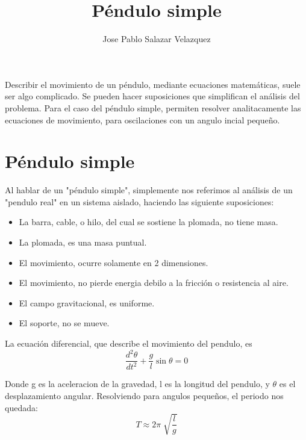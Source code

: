 \documentclass[12pt]{article}
\title{Péndulo simple}
\author{Jose Pablo Salazar Velazquez}
\date{}
\begin{document}
\maketitle
   Describir el movimiento de un péndulo, mediante ecuaciones matemáticas, suele ser algo complicado. Se pueden hacer suposiciones que simplifican el análisis del problema. Para el caso del péndulo simple, permiten resolver analitacamente las ecuaciones de movimiento, para oscilaciones con un angulo incial pequeño.
    
    \section{Péndulo simple}
Al hablar de un "péndulo simple", simplemente nos referimos al análisis de un "pendulo real" en un sistema aislado, haciendo las siguiente suposiciones:
          \begin{itemize}
         \item La barra, cable, o hilo, del cual se sostiene la plomada, no tiene masa.
         \item La plomada, es una masa puntual.
         \item El movimiento, ocurre solamente en 2 dimensiones.
         \item El movimiento, no pierde energia debilo a la fricción o resistencia al aire.
         \item El campo gravitacional, es uniforme.
         \item El soporte, no se mueve.
       \end{itemize}
 La ecuación diferencial, que describe el movimiento del pendulo, es
 \begin{equation}
 \frac{d^2\theta}{dt^2} + \frac{g}{l}\sin\theta = 0
 \end{equation}
 

 Donde g es la aceleracion de la gravedad, l es la longitud del pendulo, y $\theta$ es el desplazamiento angular.
 Resolviendo para angulos pequeños, el periodo nos quedada:
 \begin{equation}
T \approx 2\pi \sqrt[]{\frac{l}{g}}
\end{equation}
\end{document}
